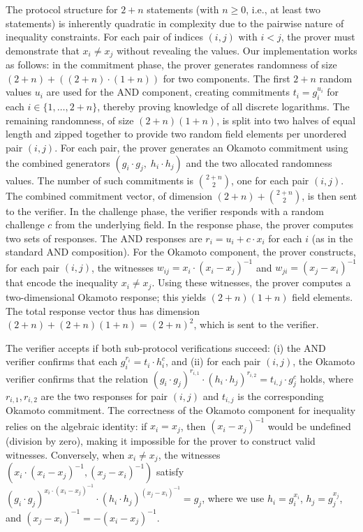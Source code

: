 \documentclass[sigconf,anonymous,review]{acmart}
\begin{document}
The protocol structure for $2+n$ statements (with $n \ge 0$, i.e., at least two statements) is inherently quadratic in complexity due to the pairwise nature of inequality constraints. For each pair of indices $(i, j)$ with $i < j$, the prover must demonstrate that $x_i \neq x_j$ without revealing the values. Our implementation works as follows: in the commitment phase, the prover generates randomness of size $(2 + n) + ((2 + n) \cdot (1 + n))$ for two components. The first $2+n$ random values $u_i$ are used for the AND component, creating commitments $t_i = g_i^{u_i}$ for each $i \in \{1,\dots,2+n\}$, thereby proving knowledge of all discrete logarithms. The remaining randomness, of size $(2+n)(1+n)$, is split into two halves of equal length and zipped together to provide two random field elements per unordered pair $(i,j)$. For each pair, the prover generates an Okamoto commitment using the combined generators $(g_i \cdot g_j,\; h_i \cdot h_j)$ and the two allocated randomness values. 
The number of such commitments is $\binom{2+n}{2}$, one for each  pair $(i,j)$. The combined commitment vector, of dimension $(2+n) + \binom{2+n}{2}$, is then sent to the verifier. In the challenge phase, the verifier responds with a random challenge $c$ from the underlying field. In the response phase, the prover computes two sets of responses. The AND responses are $r_i = u_i + c \cdot x_i$ for each $i$ (as in the standard AND composition). For the Okamoto component, the prover constructs, for each pair $(i,j)$, the witnesses $w_{ij} = x_i \cdot (x_i - x_j)^{-1}$ and $w_{ji} = (x_j - x_i)^{-1}$ that encode the inequality $x_i \neq x_j$. Using these witnesses, the prover computes a two-dimensional Okamoto response; this yields $(2+n)(1+n)$ field elements. The total response vector thus has dimension $(2+n) + (2+n)(1+n) = (2+n)^2$, which is sent to the verifier.

The verifier accepts if both sub-protocol verifications succeed: (i) the AND verifier confirms that each $g_i^{r_i} = t_i \cdot h_i^c$, and (ii) for each pair $(i, j)$, the Okamoto verifier confirms that the relation $(g_i \cdot g_j)^{r_{i,1}} \cdot (h_i \cdot h_j)^{r_{i,2}} = t_{i,j} \cdot g_j^c$ holds, where $r_{i,1}, r_{i,2}$ are the two responses for pair $(i,j)$ and $t_{i,j}$ is the corresponding Okamoto commitment. The correctness of the Okamoto component for inequality relies on the algebraic identity: if $x_i = x_j$, then $(x_i - x_j)^{-1}$ would be undefined (division by zero), making it impossible for the prover to construct valid witnesses. Conversely, when $x_i \neq x_j$, the witnesses $\left(x_i \cdot (x_i - x_j)^{-1}, (x_j - x_i)^{-1}\right)$ satisfy $(g_i \cdot g_j)^{x_i \cdot (x_i - x_j)^{-1}} \cdot (h_i \cdot h_j)^{(x_j - x_i)^{-1}} = g_j$, where we use $h_i = g_i^{x_i}$, $h_j = g_j^{x_j}$, and $(x_j - x_i)^{-1} = -(x_i - x_j)^{-1}$.
\end{document}
